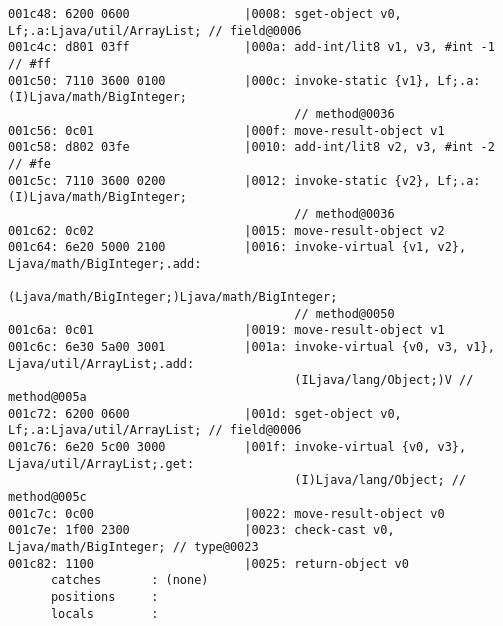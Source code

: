 \begin{lstlisting}
001c48: 6200 0600                |0008: sget-object v0, Lf;.a:Ljava/util/ArrayList; // field@0006
001c4c: d801 03ff                |000a: add-int/lit8 v1, v3, #int -1 // #ff
001c50: 7110 3600 0100           |000c: invoke-static {v1}, Lf;.a:(I)Ljava/math/BigInteger;
                                        // method@0036
001c56: 0c01                     |000f: move-result-object v1
001c58: d802 03fe                |0010: add-int/lit8 v2, v3, #int -2 // #fe
001c5c: 7110 3600 0200           |0012: invoke-static {v2}, Lf;.a:(I)Ljava/math/BigInteger;
                                        // method@0036
001c62: 0c02                     |0015: move-result-object v2
001c64: 6e20 5000 2100           |0016: invoke-virtual {v1, v2}, Ljava/math/BigInteger;.add:
                                        (Ljava/math/BigInteger;)Ljava/math/BigInteger;
                                        // method@0050
001c6a: 0c01                     |0019: move-result-object v1
001c6c: 6e30 5a00 3001           |001a: invoke-virtual {v0, v3, v1}, Ljava/util/ArrayList;.add:
                                        (ILjava/lang/Object;)V // method@005a
001c72: 6200 0600                |001d: sget-object v0, Lf;.a:Ljava/util/ArrayList; // field@0006
001c76: 6e20 5c00 3000           |001f: invoke-virtual {v0, v3}, Ljava/util/ArrayList;.get:
                                        (I)Ljava/lang/Object; // method@005c
001c7c: 0c00                     |0022: move-result-object v0
001c7e: 1f00 2300                |0023: check-cast v0, Ljava/math/BigInteger; // type@0023
001c82: 1100                     |0025: return-object v0
      catches       : (none)
      positions     :
      locals        :


\end{lstlisting}
